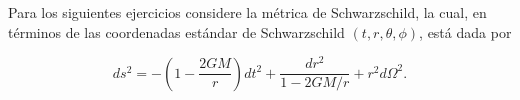 


\begin{flushleft}
Para los siguientes ejercicios considere la métrica de Schwarzschild, la cual, en términos de las coordenadas estándar de
Schwarzschild $(t,r,\theta,\phi)$, está dada por

\begin{equation}
ds^2 = -\left(1-\frac{2GM}{r}\right) dt^2 + \frac{dr^2}{1-2GM/r} + r^2 d\Omega^2.
  \label{eq:schw-metric}
\end{equation}
\end{flushleft}
\vspace{10mm}

\begin{questions}
  \vspace{-0.7cm}
  
  
  

\end{questions}

